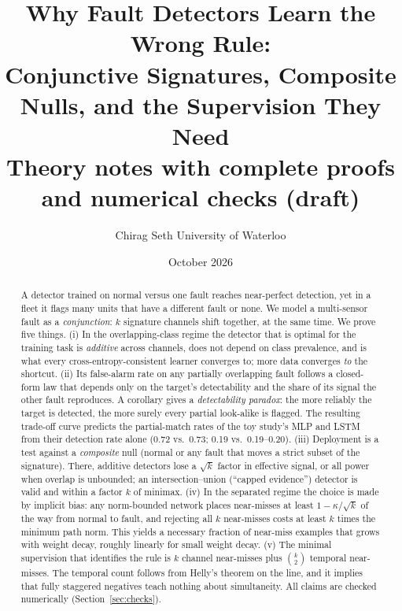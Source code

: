 \documentclass[11pt]{article}
\title{Why Fault Detectors Learn the Wrong Rule:\\ Conjunctive Signatures, Composite Nulls, and the Supervision They Need\\[4pt]
\large Theory notes with complete proofs and numerical checks (draft)}
\author{Chirag Seth \quad University of Waterloo}
\date{October 2026}
\theoremstyle{definition}
\theoremstyle{remark}
\newcommand{\1}{\mathbf{1}}
\begin{document}
\maketitle

\begin{abstract}
A detector trained on normal versus one fault reaches near-perfect detection, yet in a fleet it flags many units that have a different fault or none. We model a multi-sensor fault as a \emph{conjunction}: $k$ signature channels shift together, at the same time. We prove five things.
(i) In the overlapping-class regime the detector that is optimal for the training task is \emph{additive} across channels, does not depend on class prevalence, and is what every cross-entropy-consistent learner converges to; more data converges \emph{to} the shortcut.
(ii) Its false-alarm rate on any partially overlapping fault follows a closed-form law that depends only on the target's detectability and the share of its signal the other fault reproduces. A corollary gives a \emph{detectability paradox}: the more reliably the target is detected, the more surely every partial look-alike is flagged. The resulting trade-off curve predicts the partial-match rates of the toy study's MLP and LSTM from their detection rate alone (0.72 vs.\ 0.73; 0.19 vs.\ 0.19–0.20).
(iii) Deployment is a test against a \emph{composite} null (normal or any fault that moves a strict subset of the signature). There, additive detectors lose a $\sqrt{k}$ factor in effective signal, or all power when overlap is unbounded; an intersection–union (``capped evidence'') detector is valid and within a factor $k$ of minimax.
(iv) In the separated regime the choice is made by implicit bias: any norm-bounded network places near-misses at least $1-\kappa/\sqrt{k}$ of the way from normal to fault, and rejecting all $k$ near-misses costs at least $k$ times the minimum path norm. This yields a necessary fraction of near-miss examples that grows with weight decay, roughly linearly for small weight decay.
(v) The minimal supervision that identifies the rule is $k$ channel near-misses plus $\binom{k}{2}$ temporal near-misses. The temporal count follows from Helly's theorem on the line, and it implies that fully staggered negatives teach nothing about simultaneity. All claims are checked numerically (Section~\ref{sec:checks}).
\end{abstract}

\tableofcontents
\newpage

\end{document}
